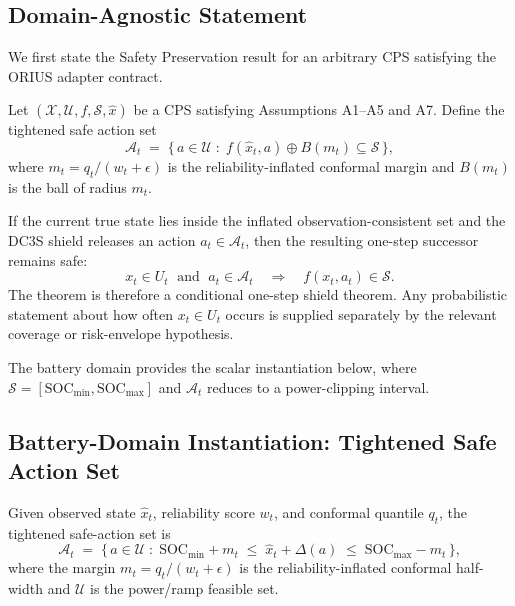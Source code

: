 \subsection{Domain-Agnostic Statement}

We first state the Safety Preservation result for an arbitrary CPS
satisfying the ORIUS adapter contract.

\begin{theorem}
\label{thm:safety-general}
Let $(\mathcal{X}, \mathcal{U}, f, \mathcal{S}, \hat{x})$ be a CPS
satisfying Assumptions A1--A5 and A7.  Define the tightened safe
action set
\[
  \mathcal{A}_t \;=\; \bigl\{\,a \in \mathcal{U} \;:\;
    f(\hat{x}_t, a) \oplus B(m_t) \subseteq \mathcal{S}\,\bigr\},
\]
where $m_t = q_t / (w_t + \epsilon)$ is the reliability-inflated
conformal margin and $B(m_t)$ is the ball of radius $m_t$.

If the current true state lies inside the inflated observation-consistent
set and the DC3S shield releases an action $a_t \in \mathcal{A}_t$, then the
resulting one-step successor remains safe:
\[
  x_t \in U_t \;\text{ and }\; a_t \in \mathcal{A}_t
  \quad\Longrightarrow\quad
  f(x_t, a_t) \in \mathcal{S}.
\]
The theorem is therefore a conditional one-step shield theorem.  Any
probabilistic statement about how often $x_t \in U_t$ occurs is supplied
separately by the relevant coverage or risk-envelope hypothesis.
\end{theorem}

The battery domain provides the scalar instantiation below, where
$\mathcal{S} = [\text{SOC}_{\min}, \text{SOC}_{\max}]$ and
$\mathcal{A}_t$ reduces to a power-clipping interval.

\subsection{Battery-Domain Instantiation: Tightened Safe Action Set}

\begin{definition}
\label{def:tightened-set}
Given observed state $\hat{x}_t$, reliability score $w_t$, and conformal
quantile $q_t$, the tightened safe-action set is
\[
  \mathcal{A}_t \;=\; \bigl\{\,a \in \mathcal{U} \;:\;
    \text{SOC}_{\min} + m_t \;\le\; \hat{x}_t + \Delta(a) \;\le\;
    \text{SOC}_{\max} - m_t\,\bigr\},
\]
where the margin $m_t = q_t / (w_t + \epsilon)$ is the reliability-inflated
conformal half-width and $\mathcal{U}$ is the power/ramp feasible set.
\end{definition}


